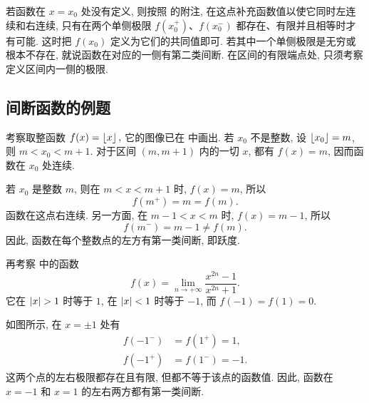 \begin{remark}\label{rem:one_sided_discontinuity_at_missing_point}
若函数在 $x=x_0$ 处没有定义, 则按照  的附注,
在这点补充函数值以使它同时左连续和右连续,
只有在两个单侧极限 $f(x_0^+)$、$f(x_0^-)$ 都存在、有限并且相等时才有可能.
这时把 $f(x_0)$ 定义为它们的共同值即可.
若其中一个单侧极限是无穷或根本不存在, 就说函数在对应的一侧有第二类间断.
在区间的有限端点处, 只须考察定义区间内一侧的极限.
\end{remark}

\subsection{间断函数的例题}\label{subsec:70}
\label{ex:floor_one_sided_continuity}
考察取整函数
$
f(x)=\left\lfloor x \right\rfloor,
$
它的图像已在  中画出.
若 $x_0$ 不是整数, 设 $\left\lfloor x_0 \right\rfloor=m$, 则 $m<x_0<m+1$.
对于区间 $(m,m+1)$ 内的一切 $x$, 都有 $f(x)=m$, 因而函数在 $x_0$ 处连续.

若 $x_0$ 是整数 $m$, 则在 $m<x<m+1$ 时, $f(x)=m$, 所以
$$
f(m^+)=m=f(m).
$$
函数在这点右连续. 另一方面, 在 $m-1<x<m$ 时, $f(x)=m-1$, 所以
$$
f(m^-)=m-1\neq f(m).
$$
因此, 函数在每个整数点的左方有第一类间断, 即跃度.


\begin{figure}
    \centering
\end{figure}
\label{ex:piecewise_limit_discontinuities}
再考察  中的函数
$$
f(x)=\lim_{n\to+\infty}\frac{x^{2n}-1}{x^{2n}+1}.
$$
它在 $\abs{x}>1$ 时等于 $1$, 在 $\left| x \right|<1$ 时等于 $-1$,
而 $f(-1)=f(1)=0$.

如图所示, 在 $x=\pm1$ 处有
$$
\begin{aligned}
f(-1^-)&=f(1^+)=1,\\
f(-1^+)&=f(1^-)=-1.
\end{aligned}
$$
这两个点的左右极限都存在且有限, 但都不等于该点的函数值.
因此, 函数在 $x=-1$ 和 $x=1$ 的左右两方都有第一类间断.

